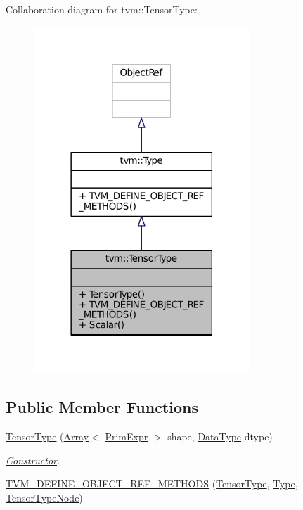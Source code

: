 Collaboration diagram for tvm\+:\+:Tensor\+Type\+:
\nopagebreak
\begin{figure}[H]
\begin{center}
\leavevmode
\includegraphics[width=230pt]{classtvm_1_1TensorType__coll__graph}
\end{center}
\end{figure}
\subsection*{Public Member Functions}
\begin{DoxyCompactItemize}
\item 
\hyperlink{classtvm_1_1TensorType_ade4460e9b02b42757a83808dec478b87}{Tensor\+Type} (\hyperlink{classtvm_1_1Array}{Array}$<$ \hyperlink{classtvm_1_1PrimExpr}{Prim\+Expr} $>$ shape, \hyperlink{namespacetvm_a41918af1a1dc386388639a9d3ad06c5d}{Data\+Type} dtype)
\begin{DoxyCompactList}\small\item\em \hyperlink{classtvm_1_1Constructor}{Constructor}. \end{DoxyCompactList}\item 
\hyperlink{classtvm_1_1TensorType_a2ad8a8a7c8e9d2cf9d33ab4fcc6e811d}{T\+V\+M\+\_\+\+D\+E\+F\+I\+N\+E\+\_\+\+O\+B\+J\+E\+C\+T\+\_\+\+R\+E\+F\+\_\+\+M\+E\+T\+H\+O\+DS} (\hyperlink{classtvm_1_1TensorType}{Tensor\+Type}, \hyperlink{classtvm_1_1Type}{Type}, \hyperlink{classtvm_1_1TensorTypeNode}{Tensor\+Type\+Node})
\end{DoxyCompactItemize}
